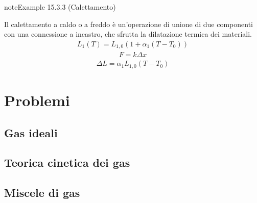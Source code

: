 \documentclass[letterpaper,10pt,italian]{jupyterBook}
\begin{document}
\begin{sphinxadmonition}{note}{Example 15.3.3 (Calettamento)}



\sphinxAtStartPar
Il calettamento a caldo o a freddo è un’operazione di unione di due componenti con una connessione a incastro, che sfrutta la dilatazione termica dei materiali.  
\begin{equation*}
\begin{split}L_1(T) = L_{1,0} (1 + \alpha_1 (T-T_0))\end{split}
\end{equation*}\begin{equation*}
\begin{split}F = k \Delta x\end{split}
\end{equation*}\begin{equation*}
\begin{split}\Delta L = \alpha_1 L_{1,0} ( T - T_0 )\end{split}
\end{equation*}\end{sphinxadmonition}

\sphinxstepscope


\section{Problemi}
\label{\detokenize{ch/thermodynamics/matter-problems:problemi}}\label{\detokenize{ch/thermodynamics/matter-problems:physics-hs-thermodynamics-matter-problems}}\label{\detokenize{ch/thermodynamics/matter-problems::doc}}

\subsection{Gas ideali}
\label{\detokenize{ch/thermodynamics/matter-problems:gas-ideali}}

\subsection{Teorica cinetica dei gas}
\label{\detokenize{ch/thermodynamics/matter-problems:teorica-cinetica-dei-gas}}

\subsection{Miscele di gas}
\label{\detokenize{ch/thermodynamics/matter-problems:miscele-di-gas}}
\end{document}
